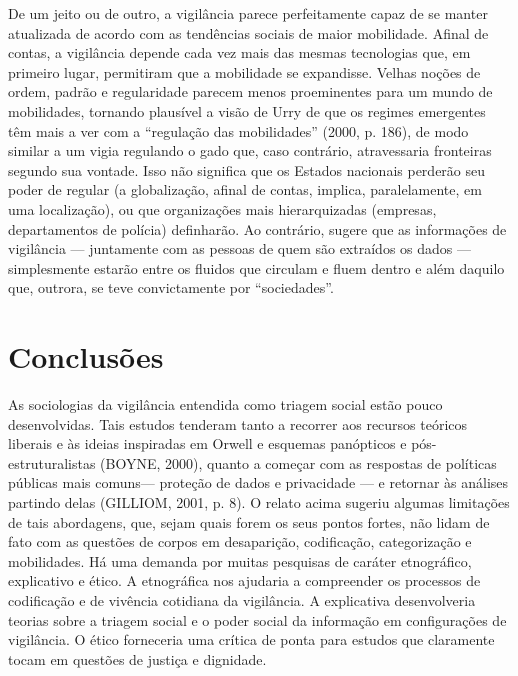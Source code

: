 De um jeito ou de outro, a vigilância parece perfeitamente capaz de se
manter atualizada de acordo com as tendências sociais de maior
mobilidade. Afinal de contas, a vigilância depende cada vez mais das
mesmas tecnologias que, em primeiro lugar, permitiram que a mobilidade
se expandisse. Velhas noções de ordem, padrão e regularidade parecem
menos proeminentes para um mundo de mobilidades, tornando plausível a
visão de Urry de que os regimes emergentes têm mais a ver com a
``regulação das mobilidades'' (2000, p. 186), de modo similar a um vigia
regulando o gado que, caso contrário, atravessaria fronteiras segundo
sua vontade. Isso não significa que os Estados nacionais perderão seu
poder de regular (a globalização, afinal de contas, implica,
paralelamente, em uma localização), ou que organizações mais
hierarquizadas (empresas, departamentos de polícia) definharão. Ao
contrário, sugere que as informações de vigilância --- juntamente com as
pessoas de quem são extraídos os dados --- simplesmente estarão entre os
fluidos que circulam e fluem dentro e além daquilo que, outrora, se teve
convictamente por ``sociedades''.

\section{Conclusões}

As sociologias da vigilância entendida como triagem social estão pouco
desenvolvidas. Tais estudos tenderam tanto a recorrer aos recursos
teóricos liberais e às ideias inspiradas em Orwell e esquemas panópticos
e pós-estruturalistas (BOYNE, 2000), quanto a começar com as respostas
de políticas públicas mais comuns--- proteção de dados e privacidade ---
e retornar às análises partindo delas (GILLIOM, 2001, p. 8). O relato
acima sugeriu algumas limitações de tais abordagens, que, sejam quais
forem os seus pontos fortes, não lidam de fato com as questões de corpos
em desaparição, codificação, categorização e mobilidades. Há uma demanda
por muitas pesquisas de caráter etnográfico, explicativo e ético. A
etnográfica nos ajudaria a compreender os processos de codificação e de
vivência cotidiana da vigilância. A explicativa desenvolveria teorias
sobre a triagem social e o poder social da informação em configurações
de vigilância. O ético forneceria uma crítica de ponta para estudos que
claramente tocam em questões de justiça e dignidade.

